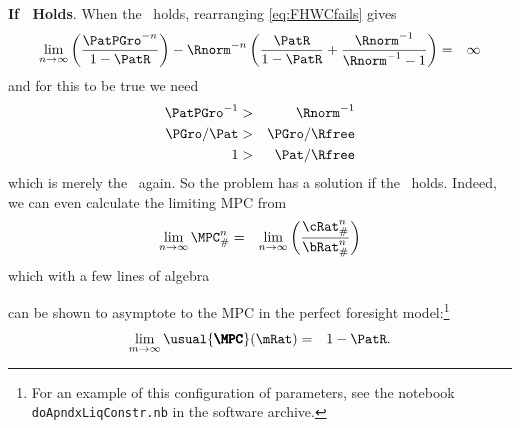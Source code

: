 \documentclass[./BufferStockTheory.tex]{subfiles}
\begin{document}
{\bf If \RIC~Holds}.  When the \RIC~holds, rearranging \eqref{eq:FHWCfails} gives
\begin{eqnarray*}
  \lim_{n \rightarrow \infty} \left(\frac{\PatPGro^{-n}}{1-\PatR}\right)-\Rnorm^{-n}\left(\frac{\PatR}{1-\PatR}+\frac{\Rnorm^{-1}}{\Rnorm^{-1}-1}\right) & = & \infty
\end{eqnarray*}
and for this to be true we need
\begin{eqnarray*}
  \PatPGro^{-1} & > & \Rnorm^{-1}
\\ \PGro/\Pat & > & \PGro/\Rfree
\\ 1 & > & \Pat/\Rfree
\end{eqnarray*}
which is merely the \RIC~again.  So the problem has a solution if the \RIC~holds.  Indeed,
we can even calculate the limiting MPC from
\begin{eqnarray}
  \lim_{n \rightarrow \infty} \MPC^{n}_{\#} & = & \lim_{n \rightarrow \infty} \left(\frac{\cRat_{\#}^{n}}{\bRat_{\#}^{n}}\right)
\end{eqnarray}
which with a few lines of algebra
\begin{comment}
Calculate the limit of
\begin{eqnarray}
\left(\frac{\PatPGro^{-n}}{\PatPGro^{-n}/(1-\PatR) - (1-\Rnorm^{-1}\Rnorm^{-n})/(1-\Rnorm^{-1})}\right) & = & \left(\frac{1}{1/(1-\PatR) + \Rnorm^{-n}\Rnorm^{-1}/(1-\Rnorm^{-1})}\right)
\end{eqnarray}
\end{comment}
can be shown to asymptote to the MPC in the perfect foresight model:\footnote{For an example of this configuration of parameters, see the notebook \texttt{doApndxLiqConstr.nb} in the software archive.}
\begin{eqnarray}
  \lim_{m \rightarrow \infty} \usual{\pmb{\MPC}}(\mRat) & = & 1-\PatR.
\end{eqnarray}
\end{document}
